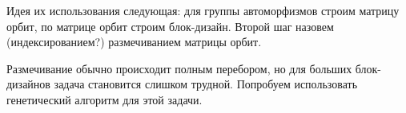 \documentclass[a4,12pt]{article}
\theoremstyle{remark}
\begin{document}
Идея их использования следующая: для группы автоморфизмов строим матрицу орбит, по матрице орбит строим блок-дизайн. Второй шаг назовем (индексированием?) размечиванием матрицы орбит.

Размечивание обычно происходит полным перебором, но для больших блок-дизайнов задача становится слишком трудной. Попробуем использовать генетический алгоритм для этой задачи.
\end{document}
